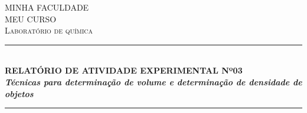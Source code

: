 \documentclass[12pt]{article}
\begin{document}
\begin{titlepage}

\newcommand{\HRule}{\rule{\linewidth}{0.5mm}} %

\center %
 

\textsc{\normalsize MINHA FACULDADE}\\[1.0cm] %
\textsc{\Large MEU CURSO}\\[0.2cm] %
\textsc{\large Laboratório de química}\\[0.2cm] %


\HRule \\[0.4cm]
{ \huge \bfseries \LARGE{RELATÓRIO DE ATIVIDADE EXPERIMENTAL Nº03} \\ [1.0cm]
\emph{\large{Técnicas para determinação de volume e determinação de densidade de objetos}}
}\\[0.4cm] %
\HRule \\[1.0cm]
 




\end{titlepage}
\end{document}
